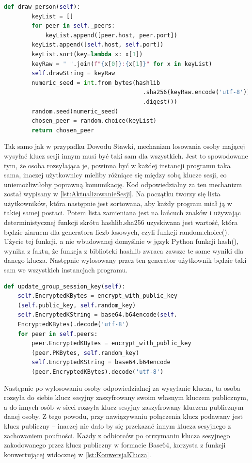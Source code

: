 \begin{lstlisting}[language=Python, extendedchars=true, caption={Wybieranie osoby}, label={lst:WybieranieOsoby}]
    def draw_person(self):
        keyList = []
        for peer in self._peers:
            keyList.append([peer.host, peer.port])
        keyList.append([self.host, self.port])
        keyList.sort(key=lambda x: x[1]) 
        keyRaw = " ".join(f"{x[0]}:{x[1]}" for x in keyList)
        self.drawString = keyRaw
        numeric_seed = int.from_bytes(hashlib
                                        .sha256(keyRaw.encode('utf-8'))
                                        .digest())
        random.seed(numeric_seed)
        chosen_peer = random.choice(keyList)
        return chosen_peer
\end{lstlisting}

Tak samo jak w przypadku Dowodu Stawki, mechanizm losowania osoby mającej wysyłać klucz sesji innym musi być taki sam dla wszystkich. Jest to spowodowane tym, że osoba rozsyłająca je, powinna być w każdej instancji programu taka sama, inaczej użytkownicy mieliby różniące się między sobą klucze sesji, co uniemożliwiłoby poprawną komunikację. Kod odpowiedzialny za ten mechanizm został wypisany w \lstlistingname{ \ref{lst:AktualizowanieSesji}}. Na początku tworzy się lista użytkowników, która następnie jest sortowana, aby każdy program miał ją w takiej samej postaci. Potem lista zamieniana jest na łańcuch znaków i używając deterministycznej funkcji skrótu hashlib.sha256 uzyskiwana jest wartość, która będzie ziarnem dla generatora liczb losowych, czyli funkcji random.choice(). Użycie tej funkcji, a nie wbudowanej domyślnie w język Python funkcji hash(), wynika z faktu, że funkcja z biblioteki hashlib zwraca zawsze te same wyniki dla danego klucza. Następnie wylosowany przez ten generator użytkownik będzie taki sam we wszystkich instancjach programu.

\begin{lstlisting}[language=Python, extendedchars=true, caption={Funkcja aktualizująca grupowy klucz sesji}, label={lst:AktualizowanieSesji}]
def update_group_session_key(self):
    self.EncryptedKBytes = encrypt_with_public_key
    (self.public_key, self.random_key)
    self.EncryptedKString = base64.b64encode(self.
    EncryptedKBytes).decode('utf-8')
    for peer in self.peers:
        peer.EncryptedKBytes = encrypt_with_public_key
        (peer.PKBytes, self.random_key)
        self.EncryptedKString = base64.b64encode
        (peer.EncryptedKBytes).decode('utf-8')
\end{lstlisting}
Następnie po wylosowaniu osoby odpowiedzialnej za wysyłanie klucza, ta osoba rozsyła do siebie klucz sesyjny zaszyfrowany swoim własnym kluczem publicznym, a do innych osób w sieci  rozsyła klucz sesyjny zaszyfrowany kluczem publicznym danej osoby. Z tego powodu, przy nawiązywaniu połączenia klucz podawany jest klucz publiczny – inaczej nie dało by się przekazać innym klucza sesyjnego z zachowaniem poufności.
Każdy z odbiorców po otrzymaniu klucza sesyjnego zakodowanego przez klucz publiczny w formacie Base64, korzysta z funkcji konwertującej widocznej w \lstlistingname{ \ref{lst:KonwersjaKlucza}}. 


